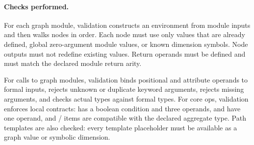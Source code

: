 \paragraph{Checks performed.}
For each graph module, validation constructs an environment from module inputs
and then walks nodes in order.  Each node must use only values that are already
defined, global zero-argument module values, or known dimension symbols.  Node
outputs must not redefine existing values.  Return operands must be defined and
must match the declared module return arity.

For calls to graph modules, validation binds positional and attribute operands
to formal inputs, rejects unknown or duplicate keyword arguments, rejects
missing arguments, and checks actual types against formal types.  For core
ops, validation enforces local contracts:  has a boolean
condition and three operands,  and  have
one operand, and / items are compatible with
the declared aggregate type.  Path templates are also checked: every template
placeholder must be available as a graph value or symbolic dimension.
